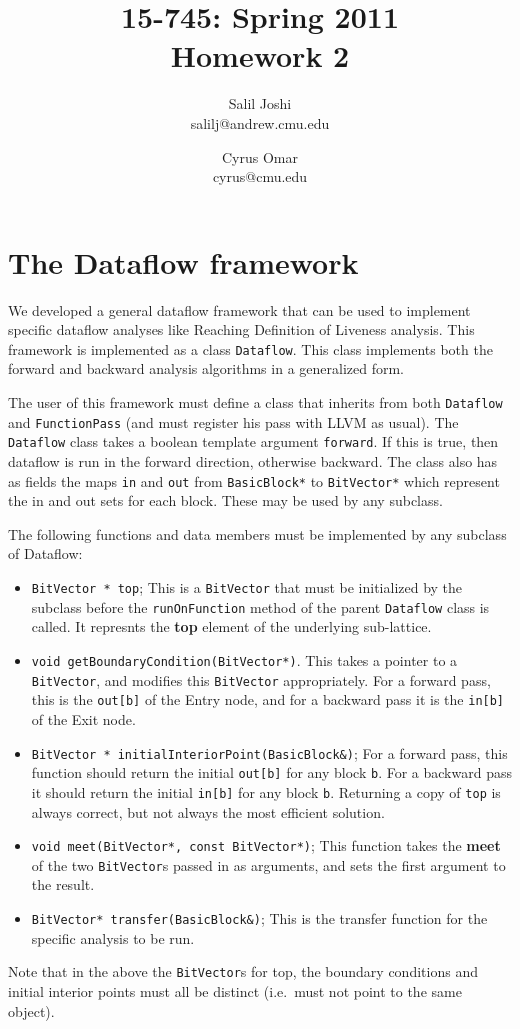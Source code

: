 \documentclass[12pt]{article}
\title{{\small 15-745: Spring 2011}\\Homework 2}
\author{Salil Joshi\\
salilj@andrew.cmu.edu
\and
Cyrus Omar\\
cyrus@cmu.edu
}
\date{}                                           %
\begin{document}
\maketitle
\section{The Dataflow framework}
We developed a general dataflow framework that can be used to implement specific dataflow analyses like Reaching Definition of Liveness analysis. This framework is implemented as a class \verb|Dataflow|. This class implements both the forward and backward analysis algorithms in a generalized form.

The user of this framework must define a class that inherits from both \verb|Dataflow| and \verb|FunctionPass| (and must register his pass with LLVM as usual). The \verb|Dataflow| class takes a boolean template argument \verb|forward|. If this is true, then dataflow is run in the forward direction, otherwise backward. The class also has as fields the maps \verb|in| and \verb|out| from \verb|BasicBlock*| to \verb|BitVector*| which represent the in and out sets for each block. These may be used by any subclass.

The following functions and data members must be implemented by any subclass of Dataflow:
\begin{itemize}
\item \verb|BitVector * top|; This is a \verb|BitVector| that must be initialized by the subclass before the \verb|runOnFunction| method of the parent \verb|Dataflow| class is called. It represnts the \textbf{top} element of the underlying sub-lattice.
\item \verb|void getBoundaryCondition(BitVector*)|. This takes a pointer to a \verb|BitVector|, and modifies this \verb|BitVector| appropriately. For a forward pass, this is the \verb|out[b]| of the Entry node, and for a backward pass it is the \verb|in[b]| of the Exit node.
\item \verb|BitVector * initialInteriorPoint(BasicBlock&)|; For a forward pass, this function should return the initial \verb|out[b]| for any block \verb|b|. For a backward pass it should return the initial \verb|in[b]| for any block \verb|b|. Returning a copy of \verb|top| is always correct, but not always the most efficient solution.

\item \verb|void meet(BitVector*, const BitVector*)|; This function takes the \textbf{meet} of the two \verb|BitVector|s passed in as arguments, and sets the first argument to the result.

\item \verb|BitVector* transfer(BasicBlock&)|; This is the transfer function for the specific analysis to be run.
\end{itemize}
Note that in the above the \verb|BitVector|s for top, the boundary conditions and initial interior points must all be distinct (i.e.\ must not point to the same object).
\end{document}
